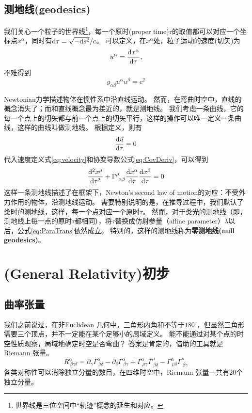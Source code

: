 \subsection{测地线(geodesics)}
我们关心一个粒子的世界线\footnote{世界线是三位空间中“轨迹”概念的延生和对应。}，每一个原时(proper time)$\tau$的取值都可以对应一个坐标点$x^\alpha$，同时有${\rm d}\tau = \sqrt{-{\rm d}s^2}/c$。
可以定义，在$x^\alpha$处，粒子运动的速度(切矢)为
\begin{equation}\label{eq:velocity}
  u^\alpha = \frac{{\rm d}x^\alpha}{{\rm d}\tau},
\end{equation}
不难得到
\begin{equation}\label{eq:gmunuNorm}
  g_{\alpha \beta}u^\alpha u^\beta = c^2  
\end{equation}

Newtonian力学描述物体在惯性系中沿直线运动。
然而，在弯曲时空中，直线的概念消失了；而和直线概念最为接近的，就是测地线。
我们考虑一条曲线，它的每一个点上的切矢都与前一个点上的切矢平行，这样的操作可以唯一定义一条曲线，这样的曲线叫做测地线。
根据定义，则有
\begin{equation}\label{eq:ParaTrans}
  \frac{{\rm d}\vec{u}}{{\rm d}\tau}=0
\end{equation}
代入速度定义式\ref{eq:velocity}和协变导数公式\ref{eq:CovDeriv}，可以得到
\begin{equation}\label{eq:geodesics}
  \frac{{\rm d}^2 x^\mu}{{\rm d}\tau^2}+ \Gamma^\mu_{~\alpha\beta}\frac{{\rm d}x^\alpha}{{\rm d}\tau}\frac{{\rm d}x^\beta}{{\rm d}\tau}=0
\end{equation}
这样一条测地线描述了在\GR 框架下，Newton's second law of motion的对应：不受外力作用的物体，沿测地线运动。
需要特别说明的是，在推导过程中，我们默认了类时的测地线，这样，每一个点对应一个原时$\tau$。
然而，对于类光的测地线（即，测地线上每一点的原时$\tau$都相同），将$\tau$替换成仿射参量（affine parameter）$\lambda$以后，公式\ref{eq:ParaTrans}依然成立。
特别的，这样的测地线称为{\textbf{零测地线(null geodesics)}}。

\section{\GR (General Relativity)初步}
\subsection{曲率张量}
我们之前说过，在非Euclidean 几何中，三角形内角和不等于$180^\circ$，但显然三角形需要三个顶点，并不一定能在某个足够小的局域定义。
能不能通过对某个点的时空性质观察，局域地确定时空是否弯曲？
答案是肯定的，借助的工具就是Riemann 张量。
\begin{equation}\label{eq:RiemannTensor}
  R^\alpha_{~\beta\gamma\delta}= \partial_\gamma \Gamma^{\alpha}_{~\beta \delta}- \partial_\delta\Gamma^{\alpha}_{~\beta \gamma }+\Gamma^{\alpha}_{~\mu \gamma }\Gamma^{\mu}_{~\beta \delta }-\Gamma^{\alpha}_{~\mu \delta }\Gamma^{\mu}_{~\beta \gamma } 
\end{equation}
各类对称性可以消除独立分量的数目，在四维时空中，Riemann 张量一共有20个独立分量。

